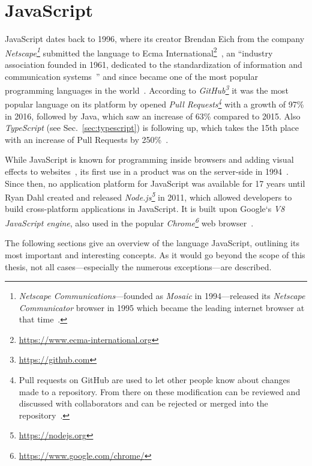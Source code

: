 \section{JavaScript}
\label{sec:javascript}

JavaScript dates back to 1996, where its creator Brendan Eich from the company \emph{Netscape\footnote{\emph{Netscape Communications}---founded as \emph{Mosaic} in 1994---released its \emph{Netscape Communicator} browser in 1995 which became the leading internet browser at that time~\cite{HistoryOfNetscape:Cooper:2014}.}} submitted the language to Ecma International\footnote{\url{https://www.ecma-international.org}}~\cite[p.~28]{ProJavaScriptDevelopment:Odell:2014}, an ``industry association founded in 1961, dedicated to the standardization of information and communication systems~\cite{EcmaInternational:Ecma}'' and since became one of the most popular programming languages in the world~\cite[p.~2]{JavaScriptTheGoodParts:Crockford:2008}. According to \emph{GitHub\footnote{\url{https://github.com}}} it was the most popular language on its platform by opened \emph{Pull Requests\footnote{Pull requests on GitHub are used to let other people know about changes made to a repository. From there on these modification can be reviewed and discussed with collaborators and can be rejected or merged into the repository~\cite{GitHubPullRequest:GitHub:2014}.}} with a growth of 97\% in 2016, followed by Java, which saw an increase of 63\% compared to 2015. Also \emph{TypeScript} (see Sec.~\ref{sec:typescript}) is following up, which takes the 15th place with an increase of Pull Requests by 250\%~\cite{GitHubOctoverse2016:GitHub:2016}.

While JavaScript is known for programming inside browsers and adding visual effects to websites~\cite[p.~4]{JavaScriptObjectProgramming:Rinehart:2015}, its first use in a product was on the server-side in 1994~\cite[p.~369]{ProJavaScriptDevelopment:Odell:2014}. Since then, no application platform for JavaScript was available for 17 years until Ryan Dahl created and released \emph{Node.js\footnote{\url{https://nodejs.org}}} in 2011, which allowed developers to build cross-platform applications in JavaScript. It is built upon Google`s \emph{V8 JavaScript engine}, also used in the popular \emph{Chrome\footnote{\url{https://www.google.com/chrome/}}} web browser~\cite[p.~369]{ProJavaScriptDevelopment:Odell:2014}.

The following sections give an overview of the language JavaScript, outlining its most important and interesting concepts. As it would go beyond the scope of this thesis, not all cases---especially the numerous exceptions---are described.

